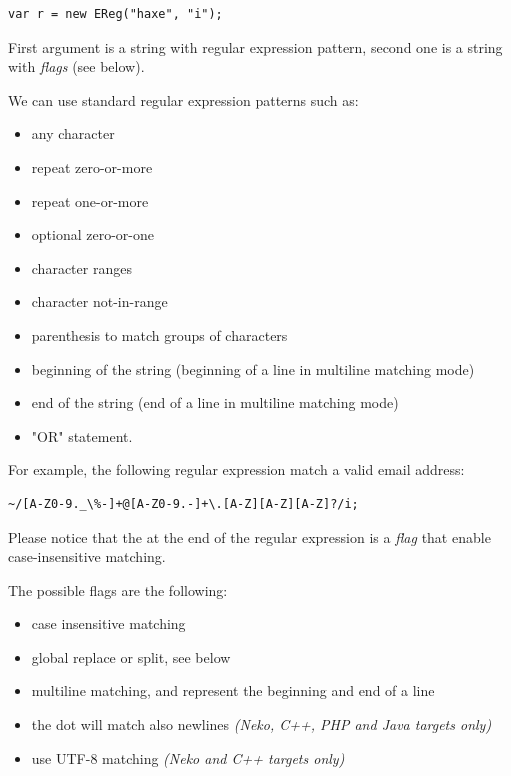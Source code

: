 \documentclass{haxe}
\begin{document}
\begin{lstlisting}
var r = new EReg("haxe", "i");
\end{lstlisting}

First argument is a string with regular expression pattern, second one is a string with \emph{flags} (see below).

We can use standard regular expression patterns such as:
\begin{itemize}
    \item {} any character
    \item \expr{*} repeat zero-or-more
    \item \expr{+} repeat one-or-more
    \item {} optional zero-or-one
    \item \expr{[A-Z0-9]} character ranges
    \item {} character not-in-range
    \item {} parenthesis to match groups of characters
    \item \expr{\textasciicircum} beginning of the string (beginning of a line in multiline matching mode)
    \item \expr{\$} end of the string (end of a line in multiline matching mode)
    \item \expr{|} "OR" statement.
\end{itemize}

For example, the following regular expression match a valid email address:
\begin{lstlisting}
~/[A-Z0-9._\%-]+@[A-Z0-9.-]+\.[A-Z][A-Z][A-Z]?/i;
\end{lstlisting}

Please notice that the  at the end of the regular expression is a \emph{flag} that enable case-insensitive matching.

The possible flags are the following:
\begin{itemize}
    \item {} case insensitive matching
    \item {} global replace or split, see below
    \item {} multiline matching, \expr{\textasciicircum} and \expr{\$} represent the beginning and end of a line
    \item {} the dot  will match also newlines \emph{(Neko, C++, PHP and Java targets only)}
    \item {} use UTF-8 matching \emph{(Neko and C++ targets only)}
\end{itemize}
\end{document}
